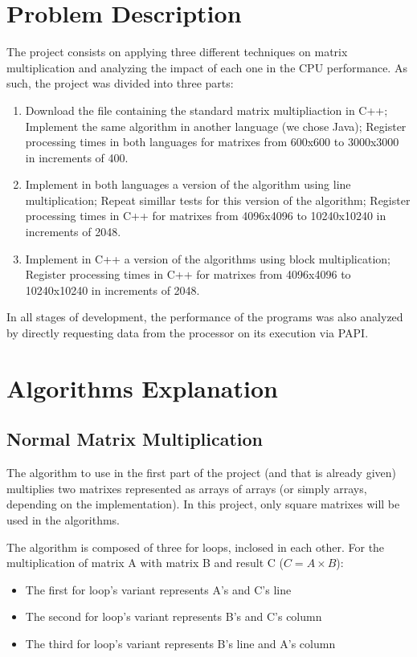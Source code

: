 \section{Problem Description}

The project consists on applying three different techniques on matrix multiplication and analyzing the impact of each one in the CPU performance. As such, the project was divided into three parts:

\begin{enumerate}
    \item Download the file containing the standard matrix multipliaction in C++; Implement the same algorithm in another language (we chose Java); Register processing times in both languages for matrixes from 600x600 to 3000x3000 in increments of 400.
    \item Implement in both languages a version of the algorithm using line multiplication; Repeat simillar tests for this version of the algorithm; Register processing times in C++ for matrixes from 4096x4096 to 10240x10240 in increments of 2048.
    \item Implement in C++ a version of the algorithms using block multiplication; Register processing times in C++ for matrixes from 4096x4096 to 10240x10240 in increments of 2048.
\end{enumerate}

In all stages of development, the performance of the programs was also analyzed by directly requesting data from the processor on its execution via PAPI.

\section{Algorithms Explanation}

\subsection{Normal Matrix Multiplication}
The algorithm to use in the first part of the project (and that is already given) multiplies two matrixes represented as arrays of arrays (or simply arrays, depending on the implementation). In this project, only square matrixes will be used in the algorithms. 

The algorithm is composed of three for loops, inclosed in each other. 
For the multiplication of matrix A with matrix B and result C ($C = A \times B$):

\begin{itemize}
    \item The first for loop's variant represents A's and C's line
    \item The second for loop's variant represents B's and C's column
    \item The third for loop's variant represents B's line and A's column
\end{itemize}

